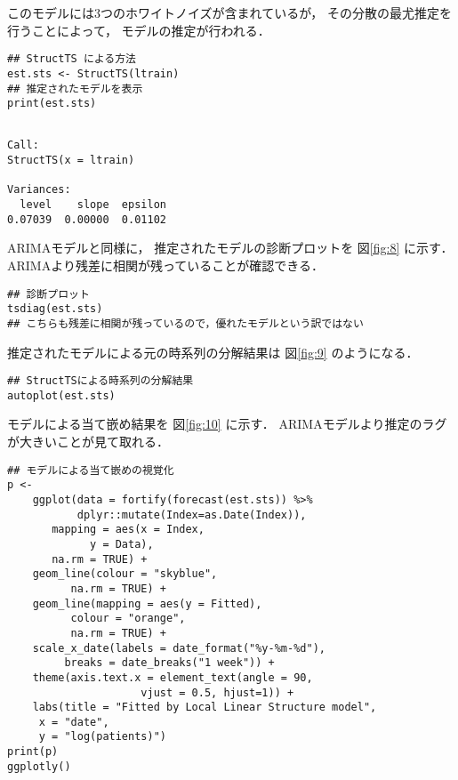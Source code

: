\documentclass[10pt,oneside,fleqn]{scrartcl}
\begin{document}
このモデルには3つのホワイトノイズが含まれているが，
その分散の最尤推定を行うことによって，
モデルの推定が行われる．

\begin{verbatim}
## StructTS による方法
est.sts <- StructTS(ltrain)
## 推定されたモデルを表示
print(est.sts)
\end{verbatim}

\begin{verbatim}

Call:
StructTS(x = ltrain)

Variances:
  level    slope  epsilon  
0.07039  0.00000  0.01102
\end{verbatim}


ARIMAモデルと同様に，
推定されたモデルの診断プロットを
図\ref{fig:8} に示す．
ARIMAより残差に相関が残っていることが確認できる．

\begin{figure}[htbp]
  \centering
  \myGraph[1]{}
\end{figure}

\begin{verbatim}
## 診断プロット
tsdiag(est.sts)
## こちらも残差に相関が残っているので，優れたモデルという訳ではない
\end{verbatim}

推定されたモデルによる元の時系列の分解結果は
図\ref{fig:9} のようになる．

\begin{figure}[htbp]
  \centering
  \myGraph[1]{}
\end{figure}

\begin{verbatim}
## StructTSによる時系列の分解結果
autoplot(est.sts)
\end{verbatim}

モデルによる当て嵌め結果を
図\ref{fig:10} に示す．
ARIMAモデルより推定のラグが大きいことが見て取れる．

\begin{figure}[htbp]
  \centering
  \myGraph[1]{}
\end{figure}

\begin{verbatim}
## モデルによる当て嵌めの視覚化
p <- 
    ggplot(data = fortify(forecast(est.sts)) %>%
	       dplyr::mutate(Index=as.Date(Index)),
	   mapping = aes(x = Index,
			 y = Data),
	   na.rm = TRUE) +
    geom_line(colour = "skyblue",
	      na.rm = TRUE) +
    geom_line(mapping = aes(y = Fitted),
	      colour = "orange",
	      na.rm = TRUE) +
    scale_x_date(labels = date_format("%y-%m-%d"), 
		 breaks = date_breaks("1 week")) + 
    theme(axis.text.x = element_text(angle = 90,
				     vjust = 0.5, hjust=1)) +
    labs(title = "Fitted by Local Linear Structure model",
	 x = "date",
	 y = "log(patients)")
print(p)
ggplotly()
\end{verbatim}
\end{document}
